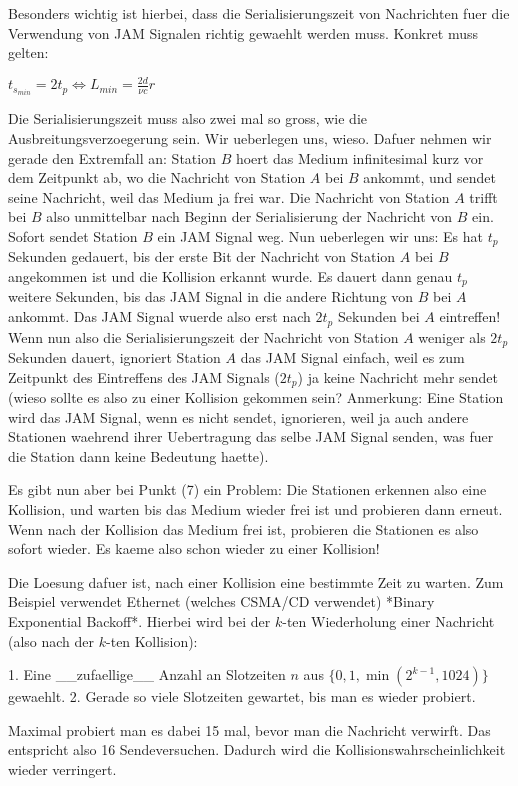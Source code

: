 Besonders wichtig ist hierbei, dass die Serialisierungszeit von Nachrichten fuer
die Verwendung von JAM Signalen richtig gewaehlt werden muss. Konkret muss
gelten:

$t_{s_{min}} = 2 t_p \iff L_{min} = \frac{2d}{\nu c} r$

Die Serialisierungszeit muss also zwei mal so gross, wie die
Ausbreitungsverzoegerung sein. Wir ueberlegen uns, wieso. Dafuer nehmen wir
gerade den Extremfall an: Station $B$ hoert das Medium infinitesimal kurz vor
dem Zeitpunkt ab, wo die Nachricht von Station $A$ bei $B$ ankommt, und sendet
seine Nachricht, weil das Medium ja frei war. Die Nachricht von Station $A$
trifft bei $B$ also unmittelbar nach Beginn der Serialisierung der
Nachricht von $B$ ein. Sofort sendet Station $B$ ein JAM Signal weg. Nun
ueberlegen wir uns: Es hat $t_p$ Sekunden gedauert, bis der erste Bit der
Nachricht von Station $A$ bei $B$ angekommen ist und die Kollision erkannt
wurde. Es dauert dann genau $t_p$ weitere Sekunden, bis das JAM Signal in die
andere Richtung von $B$ bei $A$ ankommt. Das JAM Signal wuerde also erst nach $2
t_p$ Sekunden bei $A$ eintreffen! Wenn nun also die Serialisierungszeit der
Nachricht von Station $A$ weniger als $2 t_p$ Sekunden dauert, ignoriert Station
$A$ das JAM Signal einfach, weil es zum Zeitpunkt des Eintreffens des JAM
Signals ($2 t_p$) ja keine Nachricht mehr sendet (wieso sollte es also zu einer
Kollision gekommen sein? Anmerkung: Eine Station wird das JAM Signal, wenn es
nicht sendet, ignorieren, weil ja auch andere Stationen waehrend ihrer
Uebertragung das selbe JAM Signal senden, was fuer die Station dann keine
Bedeutung haette).

Es gibt nun aber bei Punkt (7) ein Problem: Die Stationen erkennen also eine
Kollision, und warten bis das Medium wieder frei ist und probieren dann
erneut. Wenn nach der Kollision das Medium frei ist, probieren die Stationen es
also sofort wieder. Es kaeme also schon wieder zu einer Kollision!

Die Loesung dafuer ist, nach einer Kollision eine bestimmte Zeit zu warten. Zum
Beispiel verwendet Ethernet (welches CSMA/CD verwendet) *Binary Exponential
Backoff*. Hierbei wird bei der $k$-ten Wiederholung einer Nachricht (also nach
der $k$-ten Kollision):

1. Eine \_\_zufaellige\_\_ Anzahl an Slotzeiten $n$ aus $\{0, 1, \min(2^{k - 1},
   1024)\}$ gewaehlt.
2. Gerade so viele Slotzeiten gewartet, bis man es wieder probiert.

Maximal probiert man es dabei 15 mal, bevor man die Nachricht verwirft. Das
entspricht also 16 Sendeversuchen. Dadurch wird die Kollisionswahrscheinlichkeit
wieder verringert.


